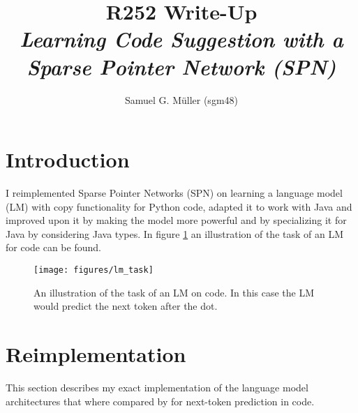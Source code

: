 \documentclass[11pt]{article}
\begin{document}


\newcommand{\ggg}[1]{\textcolor{gray}{#1}}
\newcommand{\lmatt}{LMAtt\xspace}
\newcommand{\spn}{SPN\xspace}

\title{%
R252 Write-Up\\[1mm]
\large \textit{Learning Code Suggestion with a Sparse Pointer Network (SPN)}
}
\author{Samuel G. Müller (sgm48)}
\maketitle

\section{Introduction}
I reimplemented Sparse Pointer Networks (SPN) \citep{bhoopchand2016learning} on learning a language model (LM) with copy functionality for Python code, adapted it to work with Java and improved upon it by making the model more powerful and by specializing it for Java by considering Java types. In figure \ref{task} an illustration of the task of an LM for code can be found.
\begin{figure}
\centering
\texttt{[image: figures/lm\_task]}
\caption{An illustration of the task of an LM on code. In this case the LM would predict the next token after the dot.} 
\label{task}
\end{figure}
\section{Reimplementation}
This section describes my exact implementation of the language model architectures that where compared by \cite{bhoopchand2016learning} for next-token prediction in code.
\label{reimplementation}
\end{document}
